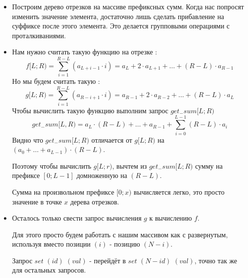 \documentclass{article}
\begin{document}
\begin{itemize}
\item Построим дерево отрезков на массиве префиксных сумм. Когда нас попросят изменить значение элемента, достаточно лишь сделать прибавление на суффиксе после этого элемента. Это делается групповыми операциями с проталкиваниями.
\item Нам нужно считать такую функцию на отрезке : 
\begin{equation}
f[L;R) = \sum_{i = 1}^{R - L}(a_{L + i - 1} \cdot i) = a_L + 2 \cdot a_{L + 1} + \ldots + (R - L) \cdot a_{R - 1}
\end{equation}
Но мы будем считать такую :
\begin{equation}
g[L;R) = \sum_{i = 1}^{R - L}(a_{R - i + 1} \cdot i) = a_{R - 1} + 2 \cdot a_{R - 2} + \ldots + (R - L) \cdot a_L
\end{equation}
Чтобы вычислить такую функцию выполним запрос $get_-sum[L;R)$
 $$get_-sum[L, R) = a_L \cdot (R - L) + \ldots + a_{R - 1} + \sum_{i = 0}^{L - 1}(R - L)\cdot a_i$$
Видно что $get_-sum[L;R)$ отличается от $g[L;R)$ на $(a_0 + \ldots + a_{L - 1}) \cdot (R - L)$. 

Поэтому чтобы вычислить $g[L;r)$, вычтем из $get_-sum[L;R)$ сумму на префиксе $[0;L - 1]$ домноженную на $(R - L)$.

Сумма на произвольном префиксе $[0;x)$ вычисляется легко, это просто значение в точке $x$ дерева отрезков.
\item Осталось только свести запрос вычисления $g$ к вычислению $f$.

Для этого просто будем работать с нашим массивом как с развернутым, используя вместо позиции $(i)$ - позицию $(N - i)$.


Запрос $set$ $(id)$ $(val)$ - перейдёт в $set$ $(N - id)$ $(val)$, точно так же для остальных запросов.
\end{itemize}
\end{document}
